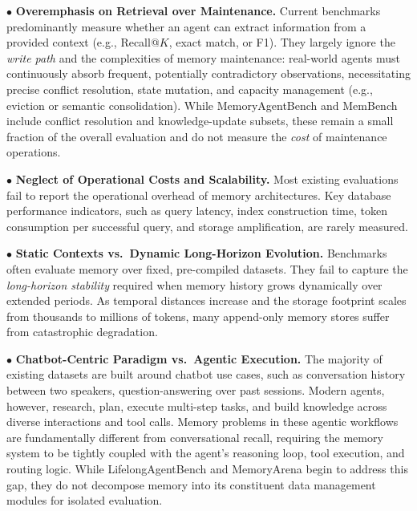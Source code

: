 \noindent $\bullet$ \textbf{Overemphasis on Retrieval over Maintenance.} Current benchmarks predominantly measure whether an agent can extract information from a provided context (e.g., Recall@$K$, exact match, or F1). They largely ignore the \textit{write path} and the complexities of memory maintenance: real-world agents must continuously absorb frequent, potentially contradictory observations, necessitating precise conflict resolution, state mutation, and capacity management (e.g., eviction or semantic consolidation). While MemoryAgentBench and MemBench include conflict resolution and knowledge-update subsets, these remain a small fraction of the overall evaluation and do not measure the \textit{cost} of maintenance operations.

\noindent $\bullet$ \textbf{Neglect of Operational Costs and Scalability.} Most existing evaluations fail to report the operational overhead of memory architectures. Key database performance indicators, such as query latency, index construction time, token consumption per successful query, and storage amplification, are rarely measured. %

\noindent $\bullet$ \textbf{Static Contexts vs.\ Dynamic Long-Horizon Evolution.} Benchmarks often evaluate memory over fixed, pre-compiled datasets. They fail to capture the \textit{long-horizon stability} required when memory history grows dynamically over extended periods. As temporal distances increase and the storage footprint scales from thousands to millions of tokens, many append-only memory stores suffer from catastrophic degradation.

\noindent $\bullet$ \textbf{Chatbot-Centric Paradigm vs.\ Agentic Execution.} The majority of existing datasets are built around chatbot use cases, such as conversation history between two speakers, question-answering over past sessions. Modern agents, however, research, plan, execute multi-step tasks, and build knowledge across diverse interactions and tool calls. Memory problems in these agentic workflows are fundamentally different from conversational recall, requiring the memory system to be tightly coupled with the agent's reasoning loop, tool execution, and routing logic. While LifelongAgentBench and MemoryArena begin to address this gap, they do not decompose memory into its constituent data management modules for isolated evaluation.
\fi



